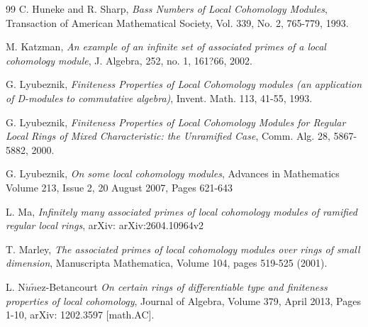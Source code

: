 \documentclass[10pt]{amsart}
\theoremstyle{plain}
\theoremstyle{definition}
\begin{document}
\begin{thebibliography}{99}
C. Huneke and R. Sharp, {\it Bass Numbers of Local Cohomology Modules}, Transaction of American Mathematical Society, Vol. 339, No. 2, 765-779, 1993.


M. Katzman, {\it An example of an infinite set of associated primes of a local cohomology module}, J. Algebra, 252, no. 1, 161?66, 2002.


G. Lyubeznik, {\it Finiteness Properties of Local Cohomology modules (an application of D-modules to commutative algebra)}, Invent. Math. 113, 41-55, 1993.

G. Lyubeznik, {\it Finiteness Properties of Local Cohomology Modules for Regular Local Rings of Mixed Characteristic: the Unramified Case}, Comm. Alg. 28, 5867-5882, 2000.


G. Lyubeznik, {\it On some local cohomology modules}, Advances in Mathematics Volume 213, Issue 2, 20 August 2007, Pages 621-643

L. Ma, \emph{Infinitely many associated primes of local cohomology modules of ramified regular local rings}, arXiv:  arXiv:2604.10964v2

T. Marley, \emph{The associated primes of local cohomology modules over rings of small dimension}, Manuscripta Mathematica, Volume 104, pages 519-525 (2001).


L. N$\acute{u}$$\tilde{n}$ez-Betancourt {\it On certain rings of differentiable type and finiteness properties of local cohomology}, Journal of Algebra, Volume 379, April 2013, Pages 1-10, arXiv: 1202.3597 [math.AC].
	

\end{thebibliography}
\end{document}
